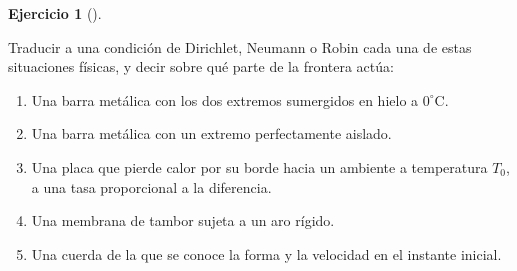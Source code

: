 \documentclass[
  spanish,
  a4paper,
]{scrbook}
\providecommand{\tightlist}{%
  \setlength{\itemsep}{0pt}\setlength{\parskip}{0pt}}
\theoremstyle{definition}
\theoremstyle{plain}
\theoremstyle{definition}
\theoremstyle{plain}
\theoremstyle{definition}
\newtheorem{exercise}{Ejercicio}[chapter]
\theoremstyle{remark}
\begin{document}
\begin{exercise}[]\protect\hypertarget{exr-condiciones-fisicas}{}\label{exr-condiciones-fisicas}

Traducir a una condición de Dirichlet, Neumann o Robin cada una de estas
situaciones físicas, y decir sobre qué parte de la frontera actúa:

\begin{enumerate}
\def\labelenumi{\alph{enumi}.}
\tightlist
\item
  Una barra metálica con los dos extremos sumergidos en hielo a
  \(0^\circ\)C.
\item
  Una barra metálica con un extremo perfectamente aislado.
\item
  Una placa que pierde calor por su borde hacia un ambiente a
  temperatura \(T_0\), a una tasa proporcional a la diferencia.
\item
  Una membrana de tambor sujeta a un aro rígido.
\item
  Una cuerda de la que se conoce la forma y la velocidad en el instante
  inicial.
\end{enumerate}

\end{exercise}
\end{document}
